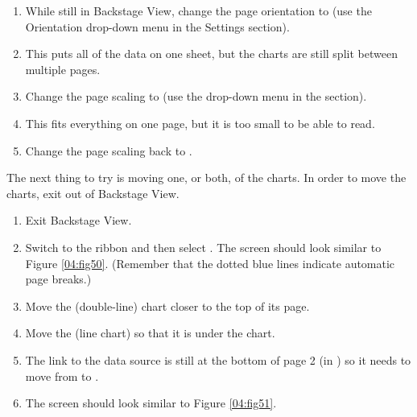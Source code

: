 \begin{enumerate}
	\item While still in Backstage View, change the page orientation to  (use the Orientation drop-down menu in the Settings section).
	\item This puts all of the data on one sheet, but the charts are still split between multiple pages.
	\item Change the page scaling to  (use the  drop-down menu in the  section).
	\item This fits everything on one page, but it is too small to be able to read.
	\item Change the page scaling back to .
\end{enumerate}

The next thing to try is moving one, or both, of the charts. In order to move the charts, exit out of Backstage View.

\begin{enumerate}
	\item Exit Backstage View.
	\item Switch to the  ribbon and then select . The screen should look similar to Figure \ref{04:fig50}. (Remember that the dotted blue lines indicate automatic page breaks.)
	\item Move the  (double-line) chart closer to the top of its page.
	\item Move the  (line chart) so that it is under the  chart.
	\item The link to the data source is still at the bottom of page 2 (in ) so it needs to move from  to .
	\item The screen should look similar to Figure \ref{04:fig51}.
\end{enumerate}

